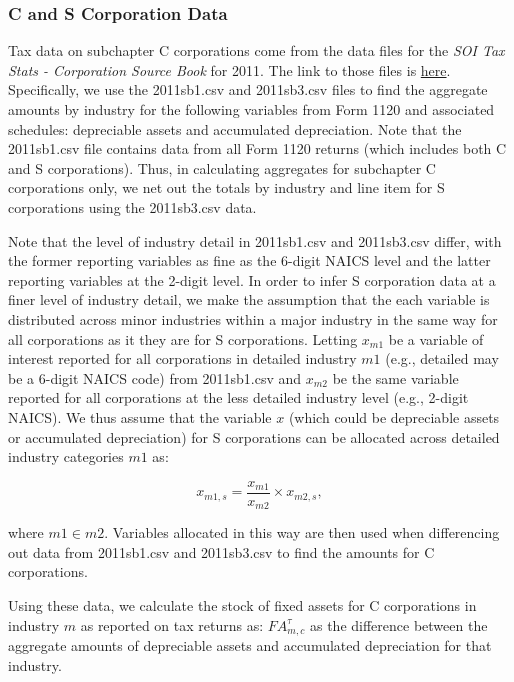 \documentclass[article,11pt,letterpaper,fleqn]{article}
\theoremstyle{definition}
\numberwithin{equation}{section}
\begin{document}
\subsubsection{C and S Corporation Data}
\label{sec:CandS}

Tax data on subchapter C corporations come from the data files for the \emph{SOI Tax Stats - Corporation Source Book} for 2011.  The link to those files is \href{http://www.irs.gov/uac/SOI-Tax-Stats-Corporation-Source-Book:-Data-File}{here}.  Specifically, we use the 2011sb1.csv and 2011sb3.csv files to find the aggregate amounts by industry for the following variables from Form 1120 and associated schedules: depreciable assets and accumulated depreciation.  Note that the 2011sb1.csv file contains data from all Form 1120 returns (which includes both C and S corporations).  Thus, in calculating aggregates for subchapter C corporations only, we net out the totals by industry and line item for S corporations using the 2011sb3.csv data.

Note that the level of industry detail in 2011sb1.csv and 2011sb3.csv differ, with the former reporting variables as fine as the 6-digit NAICS level and the latter reporting variables at the 2-digit level.  In order to infer S corporation data at a finer level of industry detail, we make the assumption that the each variable is distributed across minor industries within a major industry in the same way for all corporations as it they are for S corporations.  Letting $x_{m1}$ be a variable of interest reported for all corporations in detailed industry $m1$ (e.g., detailed may be a 6-digit NAICS code) from 2011sb1.csv and $x_{m2}$ be the same variable reported for all corporations at the less detailed industry level (e.g., 2-digit NAICS).  We thus assume that the variable $x$ (which could be depreciable assets or accumulated depreciation) for S corporations can be allocated across detailed industry categories $m1$ as:

\begin{equation}
x_{m1,s}=\frac{x_{m1}}{x_{m2}}\times x_{m2,s},
\end{equation}

\noindent\noindent where $m1\in m2$.  Variables allocated in this way are then used when differencing out data from 2011sb1.csv and 2011sb3.csv to find the amounts for C corporations.

Using these data, we calculate the stock of fixed assets for C corporations in industry $m$ as reported on tax returns as: ${FA}^{\tau}_{m,c}$ as the difference between the aggregate amounts of depreciable assets and accumulated depreciation for that industry.  
\end{document}
